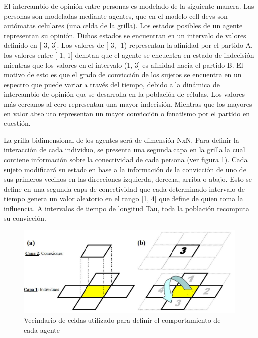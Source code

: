 El intercambio de opinión entre personas es modelado de la siguiente manera. Las personas son modeladas mediante agentes, que en el modelo cell-devs son autómatas celulares (una celda de la grilla).
Los estados posibles de un agente representan su opinión. Dichos estados se encuentran en un intervalo de valores definido en [-3, 3]. Los valores de [-3, -1)  representan la afinidad por el partido A, los valores entre [-1, 1] denotan que el agente se encuentra en estado de indecisión mientras que los valores en el intervalo (1, 3] es afinidad hacia el partido B.
El motivo de esto es que el grado de convicción de los sujetos se encuentra en un espectro que puede variar a través del tiempo, debido a la dinámica de intercambio de opinión que se desarrolla en la población de células. Los valores más cercanos al cero representan una mayor indecisión. Mientras que los mayores en valor absoluto representan un mayor convicción o fanatismo por el partido en cuestión.

La grilla bidimensional de los agentes será de dimensión NxN. Para definir la interacción de cada individuo, se presenta una segunda capa en la grilla la cual contiene información sobre la conectividad de cada persona (ver figura \ref{fig:modelo_pina}). Cada sujeto modificará su estado en base a la información de la convicción de uno de sus primeros vecinos en las direcciones izquierda, derecha, arriba o abajo. Esto se define en una segunda capa de conectividad que cada determinado intervalo de tiempo genera un valor aleatorio en el rango [1, 4] que define de quien toma la influencia. A intervalos de tiempo de longitud Tau, toda la población recomputa su convicción.

\begin{figure}[!h]
\centering
\includegraphics[scale=0.5]{imagenes/modelo_pina.png}
\caption{Vecindario de celdas utilizado para definir el comportamiento de cada agente}
\label{fig:modelo_pina}
\end{figure}

